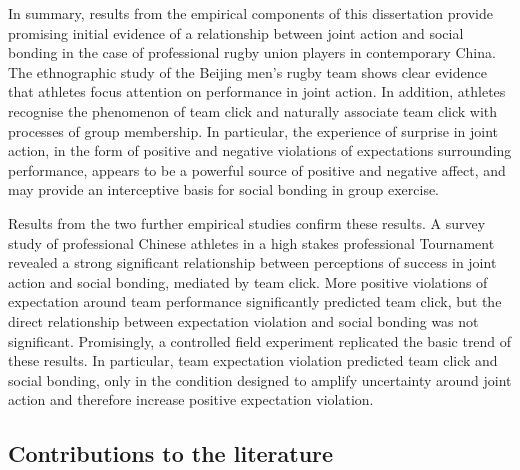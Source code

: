 In summary, results from the empirical components of this dissertation provide promising initial evidence of a relationship between joint action and social bonding in the case of professional rugby union players in contemporary China.  The ethnographic study of the Beijing men's rugby team shows clear evidence that athletes focus attention on performance in joint action.  In addition, athletes recognise the phenomenon of team click and naturally associate team click with processes of group membership.  In particular, the experience of surprise in joint action, in the form of positive and negative violations of expectations surrounding performance, appears to be a powerful source of positive and negative affect, and may provide an interceptive basis for social bonding in group exercise.

Results from the two further empirical studies confirm these results.  A survey study of professional Chinese athletes in a high stakes professional Tournament revealed a strong significant relationship between perceptions of success in joint action and social bonding, mediated by team click. More positive violations of expectation around team performance significantly predicted team click, but the direct relationship between expectation violation and social bonding was not significant.  Promisingly, a controlled field experiment replicated the basic trend of these results.  In particular, team expectation violation predicted team click and social bonding, only in the condition designed to amplify uncertainty around joint action and therefore increase positive expectation violation.



  \subsection{Contributions to the literature}

